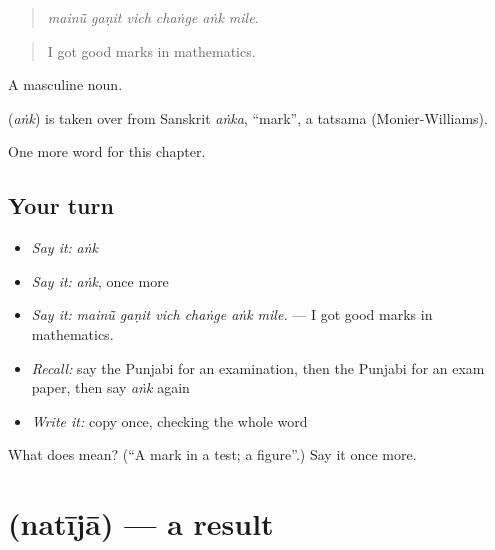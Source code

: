 \begin{quote}
     
\end{quote}

\begin{quote}
\emph{mainū̃ gaṇit vich chaṅge aṅk mile.}
\end{quote}

\begin{quote}
I got good marks in mathematics.
\end{quote}

A masculine noun.

\begin{cousinweb}
\textbf{} (\emph{aṅk}) is taken over from Sanskrit \emph{aṅka}, \textquotedblleft{}mark\textquotedblright{}, a tatsama (Monier-Williams).
\end{cousinweb}

\begin{grammarlens}[title={What you've built}]
One more word for this chapter.
\end{grammarlens}

\subsection*{Your turn}
\begin{itemize}
\raggedright
  \item \emph{Say it:} \emph{aṅk}
  \item \emph{Say it:} \emph{aṅk}, once more
  \item \emph{Say it:} \emph{mainū̃ gaṇit vich chaṅge aṅk mile.} — I got good marks in mathematics.
  \item \emph{Recall:} say the Punjabi for an examination, then the Punjabi for an exam paper, then say \emph{aṅk} again
  \item \emph{Write it:} copy \textbf{} once, checking the whole word
\end{itemize}

\begin{tcolorbox}[breakable,colback=teal!4,colframe=teal!35!black,title={Before you move on}]
What does  mean? (\textquotedblleft{}A mark in a test; a figure\textquotedblright{}.) Say it once more.
\end{tcolorbox}
\section[\texorpdfstring{\pa{ਨਤੀਜਾ} (natījā)}{ਨਤੀਜਾ (natījā)}]{ (natījā) — a result}

